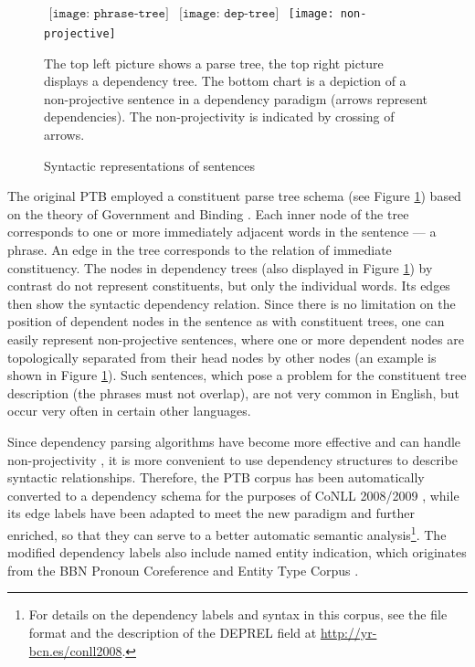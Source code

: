 \documentclass[12pt,notitlepage]{report}
\begin{document}
\begin{figure}[htb]\footnotesize
\caption{Syntactic representations of sentences}\label{fig:trees}
\begin{center}
$\begin{array}{cc}
\texttt{[image: phrase-tree]} & \texttt{[image: dep-tree]}
\end{array}$
\texttt{[image: non-projective]}
\end{center}
The top left picture shows a parse tree, the top right picture displays a dependency tree. The bottom chart is a depiction of a non-projective sentence in a dependency paradigm (arrows represent dependencies). The non-projectivity is indicated by crossing of arrows.
\end{figure}

The original PTB employed a constituent parse tree schema (see Figure \ref{fig:trees}) based on the theory of Government and Binding \citep{chomsky81}. Each inner node of the tree corresponds to one or more immediately adjacent words in the sentence --- a phrase. An edge in the tree corresponds to the relation of immediate constituency. The nodes in dependency trees (also displayed in Figure \ref{fig:trees}) by contrast do not represent constituents, but only the individual words. Its edges then show the syntactic dependency relation. Since there is no limitation on the position of dependent nodes in the sentence as with constituent trees, one can easily represent non-projective sentences, where one or more dependent nodes are topologically separated from their head nodes by other nodes (an example is shown in Figure \ref{fig:trees}). Such sentences, which pose a problem for the constituent tree description (the phrases must not overlap), are not very common in English, but occur very often in certain other languages.

Since dependency parsing algorithms have become more effective and can handle non-projectivity \citep[cf.][]{mcdonald05}, it is more convenient to use dependency structures to describe syntactic relationships. Therefore, the PTB corpus has been automatically converted to a dependency schema for the purposes of CoNLL 2008/2009 \citep{johansson07,surdeanu08}, while its edge labels have been adapted to meet the new paradigm and further enriched, so that they can serve to a better automatic semantic analysis\footnote{For details on the dependency labels and syntax in this corpus, see the file format and the description of the DEPREL field at \url{http://yr-bcn.es/conll2008}.}. The modified dependency labels also include named entity indication, which originates from the BBN Pronoun Coreference and Entity Type Corpus \citep{weischedel05}.
\end{document}
